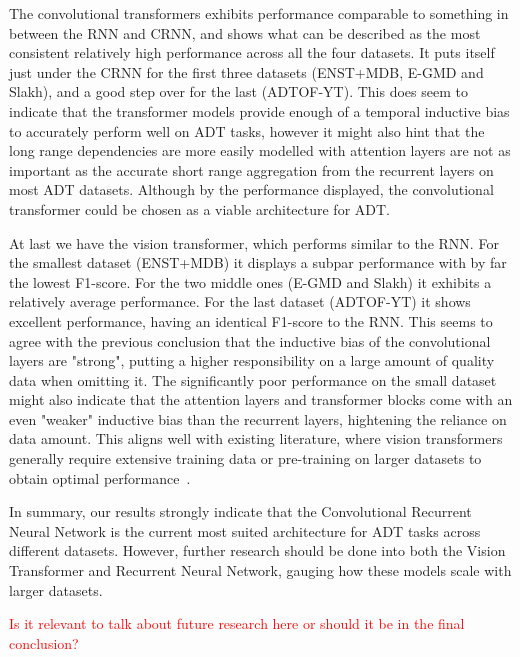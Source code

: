 The convolutional transformers exhibits performance comparable to something in between the \gls{RNN} and \gls{CRNN}, and shows what can be described as the most consistent relatively high performance across all the four datasets. It puts itself just under the \gls{CRNN} for the first three datasets (ENST+MDB, E-GMD and Slakh), and a good step over for the last (ADTOF-YT). This does seem to indicate that the transformer models provide enough of a temporal inductive bias to accurately perform well on \gls{ADT} tasks, however it might also hint that the long range dependencies are more easily modelled with attention layers are not as important as the accurate short range aggregation from the recurrent layers on most \gls{ADT} datasets. Although by the performance displayed, the convolutional transformer could be chosen as a viable architecture for \gls{ADT}.

At last we have the vision transformer, which performs similar to the \gls{RNN}. For the smallest dataset (ENST+MDB) it displays a subpar performance with by far the lowest F1-score. For the two middle ones (E-GMD and Slakh) it exhibits a relatively average performance. For the last dataset (ADTOF-YT) it shows excellent performance, having an identical F1-score to the \gls{RNN}. This seems to agree with the previous conclusion that the inductive bias of the convolutional layers are "strong", putting a higher responsibility on a large amount of quality data when omitting it. The significantly poor performance on the small dataset might also indicate that the attention layers and transformer blocks come with an even "weaker" inductive bias than the recurrent layers, hightening the reliance on data amount. This aligns well with existing literature, where vision transformers generally require extensive training data or pre-training on larger datasets to obtain optimal performance~\cite{dosovitskiy2021imageworth16x16words}.

In summary, our results strongly indicate that the Convolutional Recurrent Neural Network is the current most suited architecture for \gls{ADT} tasks across different datasets. However, further research should be done into both the Vision Transformer and Recurrent Neural Network, gauging how these models scale with larger datasets.

\textcolor{red}{Is it relevant to talk about future research here or should it be in the final conclusion?}